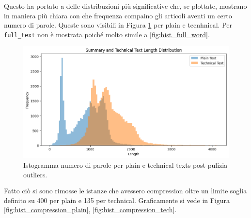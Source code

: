 \documentclass[12pt,a4paper,twoside,openright]{book}
\begin{document}
Questo ha portato a delle distribuzioni più significative che, se plottate, mostrano in maniera più chiara con che frequenza compaino gli articoli aventi un certo numero di parole. Queste sono visibili in Figura \ref{fig:updated_hist_wc} per plain e tecnhnical. Per \texttt{full\_text} non è mostrata poiché molto simile a \ref{fig:hist_full_word}.

\begin{figure}
    \centering
    \includegraphics[width=0.75\linewidth]{images/updated_hist_wc.png}
    \caption{Istogramma numero di parole per plain e technical texts post pulizia outliers.}
    \label{fig:updated_hist_wc}
\end{figure}


Fatto ciò si sono rimosse le istanze che avessero compression oltre un limite soglia definito su 400 per plain e 135 per technical. Graficamente si vede in Figura \ref{fig:hist_compression_plain}, \ref{fig:hist_compression_tech}.
\end{document}

